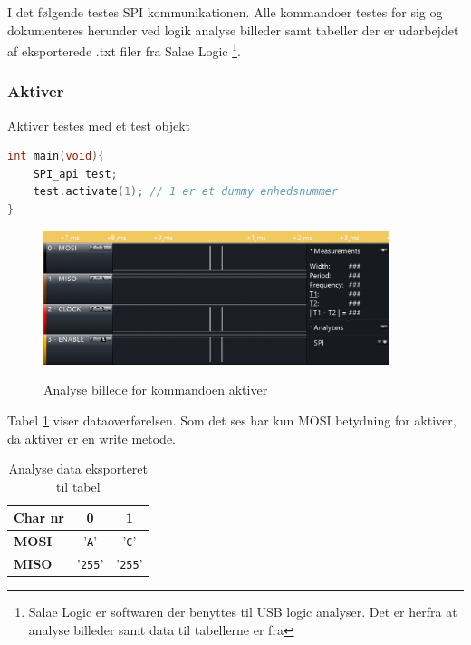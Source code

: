 \label{section:spi_integrationstest}

I det følgende testes SPI kommunikationen. Alle kommandoer testes for sig og dokumenteres herunder ved logik analyse billeder samt tabeller der er udarbejdet af eksporterede .txt filer fra Salae Logic \footnote{Salae Logic er softwaren der benyttes til USB logic analyser. Det er herfra at analyse billeder samt data til tabellerne er fra}. 


\subsubsection*{Aktiver}

Aktiver testes med et test objekt

\begin{lstlisting}[language=C]
int main(void){
	SPI_api test;
	test.activate(1); // 1 er et dummy enhedsnummer
}
\end{lstlisting}

\begin{figure}[H]
\centering
{\includegraphics[width=0.90\textwidth]{filer/integrationstest/billeder/spi_activate}}
\caption{Analyse billede for kommandoen aktiver}
\label{lab:scop_activate}
\end{figure}

Tabel \ref{table:scop_activate} viser dataoverførelsen. Som det ses har kun MOSI betydning for aktiver, da aktiver er en write metode. 

\begin{table}[H]
	\caption{Analyse data eksporteret til tabel}
	\centering
	\begin{tabular}{|l|c|c|}
		\hline 
		\textbf{Char nr} & \textbf{0} & \textbf{1} \\ 		
		\hline 
		\textbf{MOSI} & '\verb+A+' & '\verb+C+' \\ 
		\hline 
		\textbf{MISO} & '\verb+255+' & '\verb+255+' \\ 
		\hline 
	\end{tabular} 
	\label{table:scop_activate}
\end{table}


